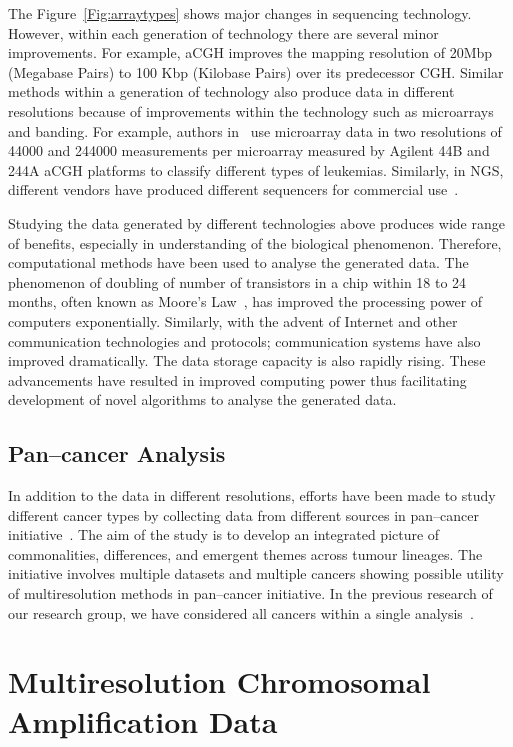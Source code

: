 The Figure~\ref{Fig:arraytypes} shows major changes in
sequencing technology. However, within each generation of technology
there are several minor improvements.  For example, aCGH 
improves the mapping resolution of 20Mbp (Megabase Pairs) to 100 
Kbp (Kilobase Pairs) over its predecessor CGH.
Similar methods within a generation of technology  also produce
data in different resolutions because  of improvements within 
the technology such as microarrays and banding. For example, authors 
in~\cite{usvasalo2010} use microarray data in two resolutions of 
44000 and 244000 measurements per microarray measured by Agilent 
44B and 244A aCGH platforms to classify different types of leukemias.
Similarly, in NGS, different vendors have produced different sequencers
for commercial use~\cite{liu2012}.

Studying the data generated by different technologies above produces 
wide range of benefits, especially in understanding of the biological
phenomenon. Therefore, computational methods have been used 
to analyse the generated data. The phenomenon of doubling of 
number of transistors in a chip within 18 to 24 months, often known as 
Moore's Law~\cite{moore1965}, has improved the processing power of 
computers exponentially. Similarly, with the advent of Internet and 
other communication technologies and protocols; communication systems
have also improved dramatically. The data storage capacity is also
rapidly rising. These  advancements have resulted in  improved 
computing power thus facilitating development of novel algorithms
to analyse the generated data.

\subsection*{Pan--cancer Analysis}
\label{ss:pancancer}

In addition to the data in different resolutions, efforts have 
been made to study different cancer types by collecting data from 
different sources in pan--cancer  initiative~\cite{pancancer}. 
The aim of the study is to develop an integrated picture of
commonalities, differences, and emergent themes across tumour 
lineages. The initiative involves multiple datasets and 
multiple cancers showing possible utility of multiresolution methods 
in pan--cancer initiative. In the previous
research of our research group, we have considered all cancers 
within a single analysis~\cite{myllykangas06}.



\section{Multiresolution Chromosomal Amplification Data}
\label{s:multchrdata}

